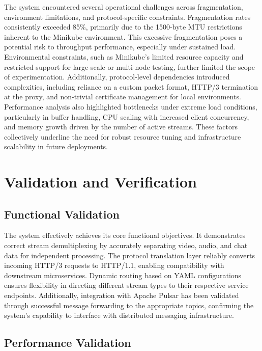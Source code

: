 The system encountered several operational challenges across fragmentation, environment limitations, and protocol-specific constraints. Fragmentation rates consistently exceeded 85\%, primarily due to the 1500-byte MTU restrictions inherent to the Minikube environment. This excessive fragmentation poses a potential risk to throughput performance, especially under sustained load. Environmental constraints, such as Minikube’s limited resource capacity and restricted support for large-scale or multi-node testing, further limited the scope of experimentation. Additionally, protocol-level dependencies introduced complexities, including reliance on a custom packet format, HTTP/3 termination at the proxy, and non-trivial certificate management for local environments. Performance analysis also highlighted bottlenecks under extreme load conditions, particularly in buffer handling, CPU scaling with increased client concurrency, and memory growth driven by the number of active streams. These factors collectively underline the need for robust resource tuning and infrastructure scalability in future deployments.

\section{Validation and Verification}



\subsection{Functional Validation}

The system effectively achieves its core functional objectives. It demonstrates correct stream demultiplexing by accurately separating video, audio, and chat data for independent processing. The protocol translation layer reliably converts incoming HTTP/3 requests to HTTP/1.1, enabling compatibility with downstream microservices. Dynamic routing based on YAML configurations ensures flexibility in directing different stream types to their respective service endpoints. Additionally, integration with Apache Pulsar has been validated through successful message forwarding to the appropriate topics, confirming the system's capability to interface with distributed messaging infrastructure.

\subsection{Performance Validation}

